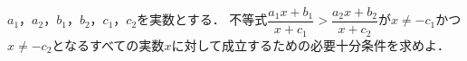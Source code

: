 \documentclass[../../main.tex]{subfiles}
\begin{document}
$a_1$，$a_2$，$b_1$，$b_2$，$c_1$，$c_2$を実数とする．
不等式$\dfrac{a_1x+b_1}{x+c_1} > \dfrac{a_2x+b_2}{x+c_2}$が$x\neq -c_1$かつ$x\neq -c_2$となるすべての実数$x$に対して成立するための必要十分条件を求めよ．
\end{document}
